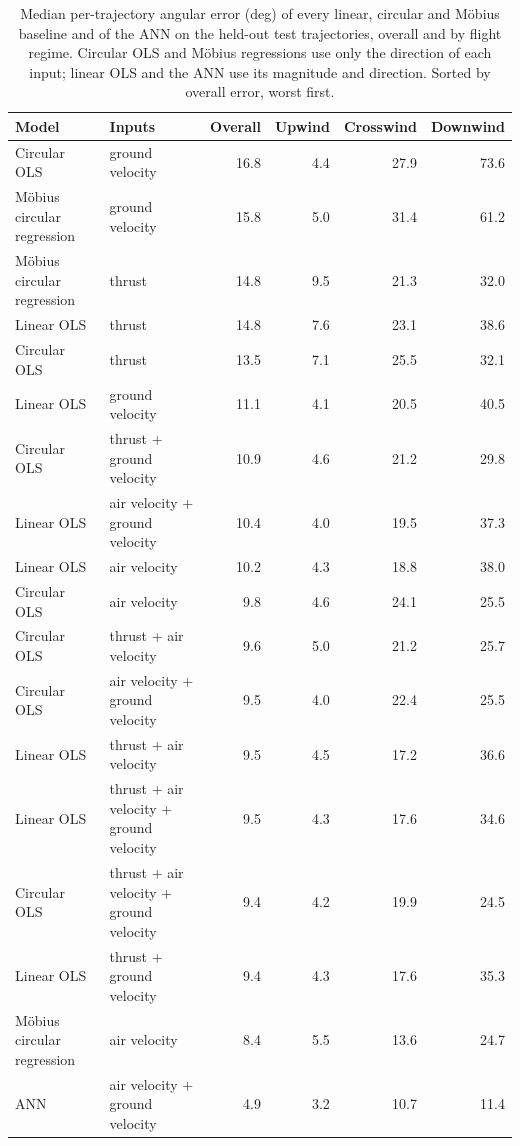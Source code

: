 \begin{table}[h!]
    \centering
    \caption{Median per-trajectory angular error (deg) of every linear, circular and M\"obius baseline and of the ANN on the held-out test trajectories, overall and by flight regime. Circular OLS and M\"obius regressions use only the direction of each input; linear OLS and the ANN use its magnitude and direction. Sorted by overall error, worst first.}
    \label{tab:baseline_regime}
    \begin{tabular}{@{}llrrrr@{}}
        \toprule
        Model & Inputs & Overall & Upwind & Crosswind & Downwind \\
        \midrule
        Circular OLS & ground velocity & 16.8 & 4.4 & 27.9 & 73.6 \\
        Möbius circular regression & ground velocity & 15.8 & 5.0 & 31.4 & 61.2 \\
        Möbius circular regression & thrust & 14.8 & 9.5 & 21.3 & 32.0 \\
        Linear OLS & thrust & 14.8 & 7.6 & 23.1 & 38.6 \\
        Circular OLS & thrust & 13.5 & 7.1 & 25.5 & 32.1 \\
        Linear OLS & ground velocity & 11.1 & 4.1 & 20.5 & 40.5 \\
        Circular OLS & thrust + ground velocity & 10.9 & 4.6 & 21.2 & 29.8 \\
        Linear OLS & air velocity + ground velocity & 10.4 & 4.0 & 19.5 & 37.3 \\
        Linear OLS & air velocity & 10.2 & 4.3 & 18.8 & 38.0 \\
        Circular OLS & air velocity & 9.8 & 4.6 & 24.1 & 25.5 \\
        Circular OLS & thrust + air velocity & 9.6 & 5.0 & 21.2 & 25.7 \\
        Circular OLS & air velocity + ground velocity & 9.5 & 4.0 & 22.4 & 25.5 \\
        Linear OLS & thrust + air velocity & 9.5 & 4.5 & 17.2 & 36.6 \\
        Linear OLS & thrust + air velocity + ground velocity & 9.5 & 4.3 & 17.6 & 34.6 \\
        Circular OLS & thrust + air velocity + ground velocity & 9.4 & 4.2 & 19.9 & 24.5 \\
        Linear OLS & thrust + ground velocity & 9.4 & 4.3 & 17.6 & 35.3 \\
        Möbius circular regression & air velocity & 8.4 & 5.5 & 13.6 & 24.7 \\
        ANN & air velocity + ground velocity & 4.9 & 3.2 & 10.7 & 11.4 \\
        \bottomrule
    \end{tabular}
\end{table}
